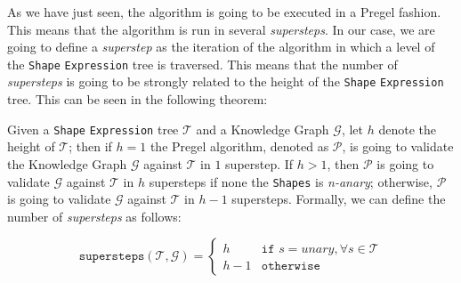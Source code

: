 As we have just seen, the algorithm is going to be executed in a Pregel fashion. This means that the algorithm is run in several \textit{supersteps}. In our case, we are going to define a \textit{superstep} as the iteration of the algorithm in which a level of the \texttt{Shape} \texttt{Expression} tree is traversed. This means that the number of \textit{supersteps} is going to be strongly related to the height of the \texttt{Shape} \texttt{Expression} tree. This can be seen in the following theorem:

\begin{theorem}
    \label{theorem:convergence}
    Given a \texttt{Shape} \texttt{Expression} tree $\mathcal{T}$ and a Knowledge Graph $\mathcal{G}$, let $h$ denote the height of $\mathcal{T}$; then if $h = 1$ the Pregel algorithm, denoted as $\mathcal{P}$, is going to validate the Knowledge Graph $\mathcal{G}$ against $\mathcal{T}$ in $1$ superstep. If $h > 1$, then $\mathcal{P}$ is going to validate $\mathcal{G}$ against $\mathcal{T}$ in $h$ supersteps if none the \texttt{Shapes} is \textit{n-anary}; otherwise, $\mathcal{P}$ is going to validate $\mathcal{G}$ against $\mathcal{T}$ in $h - 1$ supersteps. Formally, we can define the number of \textit{supersteps} as follows:

    \begin{equation}
        \texttt{supersteps}(\mathcal{T}, \mathcal{G}) =
        \begin{cases}
            h     & \texttt{if } s = unary, \forall s \in \mathcal{T} \\
            h - 1 & \texttt{otherwise}
        \end{cases}
    \end{equation}
\end{theorem}

\vspace*{-1em}


